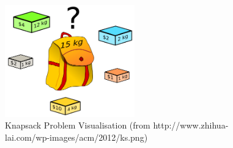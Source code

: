 \documentclass[11pt,a4paper]{article}
\begin{document}
\begin{figure}[h!]
  \centering
  \includegraphics[width=0.5\textwidth]{ks.png}
  \caption{Knapsack Problem Visualisation (from http://www.zhihua-lai.com/wp-images/acm/2012/ks.png)}
\end{figure}
\end{document}
